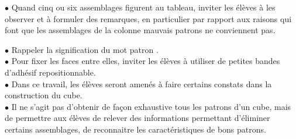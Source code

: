 \begin{exercice}
{\begin{minipage}{16.5cm}
\begin{minipage}{11.5cm}
$\bullet$ Quand cinq ou six assemblages figurent au tableau, inviter les élèves à les observer et à formuler des remarques, en particulier par rapport aux raisons qui font que les assemblages de la colonne mauvais patrons ne conviennent pas.
\end{minipage}
\qquad
\begin{minipage}{4cm}
{\small
   $\bullet$ Rappeler la signification du mot \og patron \fg. \\
   $\bullet$ Pour fixer les faces entre elles, inviter les élèves à utiliser de petites bandes d'adhésif repositionnable. \\
   $\bullet$ Dans ce travail, les élèves seront amenés à faire certains constats dans la construction du cube. \\
   $\bullet$ Il ne s'agit pas d'obtenir de façon exhaustive tous les patrons d'un cube, mais de permettre aux élèves de relever des informations permettant d'éliminer certains assemblages, de reconnaitre les caractéristiques de bons patrons. \\}
\end{minipage}
\end{minipage}
}

\vfill
\pagebreak

\end{exercice}
